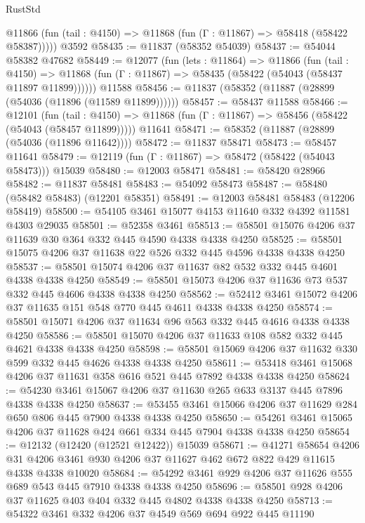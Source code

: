 \begin{lexlean}{RustStd}
\begin{coremodule}
      @11866 (fun (tail : @4150) => @11868 (fun (Γ : @11867) => @58418 (@58422 @58387)))))
    @3592
@58435 := @11837 (@58352 @54039)
@58437 := @54044 @58382 @47682
@58449 := @12077
    (fun (lets : @11864) =>
    @11866
      (fun (tail : @4150) =>
      @11868 (fun (Γ : @11867) => @58435 (@58422 (@54043 (@58437 @11897 @11899))))))
    @11588
@58456 := @11837 (@58352 (@11887 (@28899 (@54036 (@11896 (@11589 @11899))))))
@58457 := @58437 @11588
@58466 := @12101
    (fun (tail : @4150) => @11868 (fun (Γ : @11867) => @58456 (@58422 (@54043 (@58457 @11899)))))
    @11641
@58471 := @58352 (@11887 (@28899 (@54036 (@11896 @11642))))
@58472 := @11837 @58471
@58473 := @58457 @11641
@58479 := @12119 (fun (Γ : @11867) => @58472 (@58422 (@54043 @58473))) @15039
@58480 := @12003 @58471
@58481 := @58420 @28966
@58482 := @11837 @58481
@58483 := @54092 @58473
@58487 := @58480 (@58482 @58483) (@12201 @58351)
@58491 := @12003 @58481 @58483 (@12206 @58419)
@58500 := @54105 @3461 @15077 @4153 @11640 @332 @4392 @11581 @4303 @29035
@58501 := @52358 @3461
@58513 := @58501 @15076 @4206 @37 @11639 @30 @364 @332 @445 @4590 @4338 @4338 @4250
@58525 := @58501 @15075 @4206 @37 @11638 @22 @526 @332 @445 @4596 @4338 @4338 @4250
@58537 := @58501 @15074 @4206 @37 @11637 @82 @532 @332 @445 @4601 @4338 @4338 @4250
@58549 := @58501 @15073 @4206 @37 @11636 @73 @537 @332 @445 @4606 @4338 @4338 @4250
@58562 := @52412 @3461 @15072 @4206 @37 @11635 @151 @548 @770 @445 @4611 @4338 @4338 @4250
@58574 := @58501 @15071 @4206 @37 @11634 @96 @563 @332 @445 @4616 @4338 @4338 @4250
@58586 := @58501 @15070 @4206 @37 @11633 @108 @582 @332 @445 @4621 @4338 @4338 @4250
@58598 := @58501 @15069 @4206 @37 @11632 @330 @599 @332 @445 @4626 @4338 @4338 @4250
@58611 := @53418 @3461 @15068 @4206 @37 @11631 @358 @616 @521 @445 @7892 @4338 @4338 @4250
@58624 := @54230 @3461 @15067 @4206 @37 @11630 @265 @633 @3137 @445 @7896 @4338 @4338 @4250
@58637 := @53455 @3461 @15066 @4206 @37 @11629 @284 @650 @806 @445 @7900 @4338 @4338 @4250
@58650 := @54261 @3461 @15065 @4206 @37 @11628 @424 @661 @334 @445 @7904 @4338 @4338 @4250
@58654 := @12132 (@12420 (@12521 @12422)) @15039
@58671 := @41271
    @58654
    @4206
    @31
    @4206
    @3461
    @930
    @4206
    @37
    @11627
    @462
    @672
    @822
    @429
    @11615
    @4338
    @4338
    @10020
@58684 := @54292 @3461 @929 @4206 @37 @11626 @555 @689 @543 @445 @7910 @4338 @4338 @4250
@58696 := @58501 @928 @4206 @37 @11625 @403 @404 @332 @445 @4802 @4338 @4338 @4250
@58713 := @54322
    @3461
    @332
    @4206
    @37
    @4549
    @569
    @694
    @922
    @445
    @11190

\end{coremodule}
\end{lexlean}
